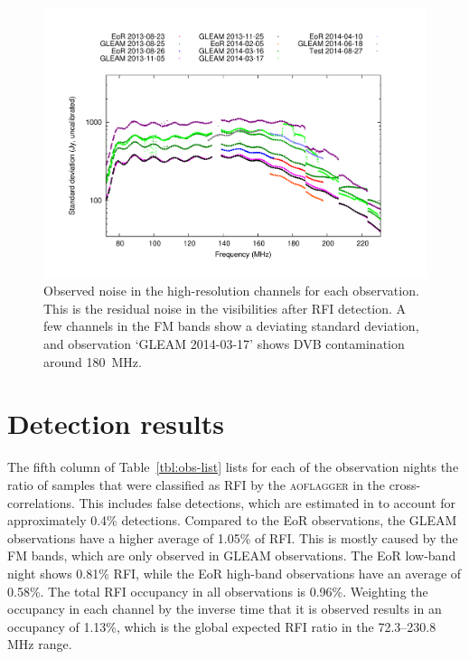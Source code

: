 \documentclass{pasa}
\begin{document}
\noindent\begin{figure}
\begin{center}\hspace*{-0.2cm}\includegraphics[width=18cm]{img/plot-stddev-per-set}\vspace{-1cm}
\caption{Observed noise in the high-resolution channels for each observation. This is the residual noise in the visibilities after RFI detection. A few channels in the FM bands show a deviating standard deviation, and observation `GLEAM 2014-03-17' shows DVB contamination around 180~MHz.}
\label{fig:stddev-per-set}
\end{center}
\end{figure}

\section{Detection results}
The fifth column of Table~\ref{tbl:obs-list} lists for each of the observation nights the ratio of samples that were classified as RFI by the \textsc{aoflagger} in the cross-correlations. This includes false detections, which are estimated in \citet{lofar-radio-environment} to account for approximately 0.4\% detections. Compared to the EoR observations, the GLEAM observations have a higher average of 1.05\% of RFI. This is mostly caused by the FM bands, which are only observed in GLEAM observations. The EoR low-band night shows 0.81\% RFI, while the EoR high-band observations have an average of 0.58\%. The total RFI occupancy in all observations is 0.96\%. Weighting the occupancy in each channel by the inverse time that it is observed results in an occupancy of 1.13\%, which is the global expected RFI ratio in the 72.3--230.8 MHz range.
\end{document}
